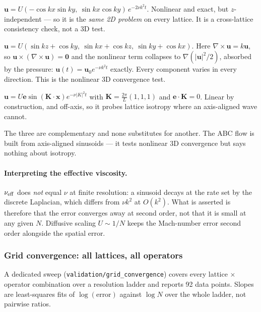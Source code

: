 \documentclass[11pt,a4paper]{article}
\newcommand{\code}[1]{\texttt{\small #1}}
\newcommand{\uu}{\bm{u}}
\newcommand{\xx}{\bm{x}}
\begin{document}
\begin{description}[leftmargin=1.6em,itemsep=3pt]
\item[Taylor--Green] $\uu = U(-\cos kx\sin ky,\ \sin kx\cos ky)\,e^{-2\nu k^2t}$.
  Nonlinear and exact, but $z$-independent --- so it is the \emph{same 2D problem}
  on every lattice. It is a cross-lattice consistency check, not a 3D test.
\item[ABC / Beltrami] $\uu = U(\sin kz+\cos ky,\ \sin kx+\cos kz,\ \sin ky+\cos kx)$.
  Here $\nabla\times\uu = k\uu$, so $\uu\times(\nabla\times\uu)=\bm0$ and the
  nonlinear term collapses to $\nabla(|\uu|^2/2)$, absorbed by the pressure:
  $\uu(t)=\uu_0e^{-\nu k^2t}$ exactly. Every component varies in every direction.
  This is the nonlinear 3D convergence test.
\item[Diagonal shear wave] $\uu = U\bm{e}\sin(\bm{K}\!\cdot\!\xx)e^{-\nu|K|^2t}$
  with $\bm{K}=\tfrac{2\pi}{L}(1,1,1)$ and $\bm{e}\!\cdot\!\bm{K}=0$. Linear by
  construction, and off-axis, so it probes lattice isotropy where an axis-aligned
  wave cannot.
\end{description}

\noindent The three are complementary and none substitutes for another. The ABC
flow is built from axis-aligned sinusoids --- it tests nonlinear 3D convergence
but says nothing about isotropy.

\paragraph{Interpreting the effective viscosity.} $\nu_{\rm eff}$ does \emph{not}
equal $\nu$ at finite resolution: a sinusoid decays at the rate set by the
discrete Laplacian, which differs from $\nu k^2$ at $O(k^2)$. What is asserted is
therefore that the error converges away at second order, not that it is small at
any given $N$. Diffusive scaling $U\sim1/N$ keeps the Mach-number error second
order alongside the spatial error.
\subsubsection{Grid convergence: all lattices, all operators}

A dedicated sweep (\code{validation/grid\_convergence}) covers every
lattice $\times$ operator combination over a resolution ladder and reports 92 data
points. Slopes are least-squares fits of $\log(\text{error})$ against $\log N$
over the whole ladder, not pairwise ratios.
\end{document}
